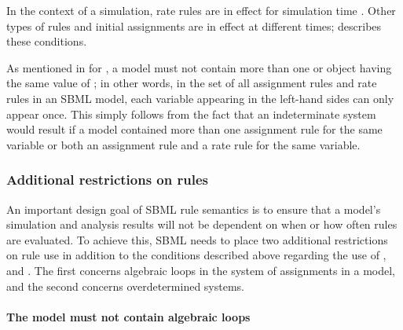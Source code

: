 
In the context of a simulation, rate rules are in effect for
simulation time .  Other types of rules and initial
assignments are in effect at different times;
 describes these conditions.

As mentioned in  for
\AssignmentRule, a model must not contain more than one \RateRule
or \AssignmentRule object having the same value of
; in other words, in the set of all assignment
rules and rate rules in an SBML model, each variable appearing in
the left-hand sides can only appear once.  This simply follows
from the fact that an indeterminate system would result if a model
contained more than one assignment rule for the same variable or
both an assignment rule and a rate rule for the same variable.


\subsubsection{Additional restrictions on rules}
\label{sec:ruleconstraints}

An important design goal of SBML rule semantics is to ensure that
a model's simulation and analysis results will not be dependent on
when or how often rules are evaluated.  To achieve this, SBML
needs to place two additional restrictions on rule use in addition
to the conditions described above regarding the use of
\AlgebraicRule, \AssignmentRule and \RateRule.  The first concerns
algebraic loops in the system of assignments in a model, and the
second concerns overdetermined systems.


\paragraph{The model must not contain algebraic loops}

